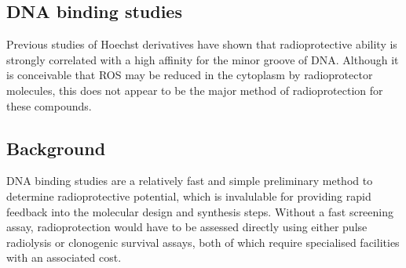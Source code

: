 \begin{refsection}

\section{DNA binding studies}
Previous studies of Hoechst derivatives have shown that radioprotective ability is strongly correlated with a high affinity for the minor groove of DNA.
Although it is conceivable that ROS may be reduced in the cytoplasm by radioprotector molecules, this does not appear to be the major method of radioprotection for these compounds.

\subsection{Background}
DNA binding studies are a relatively fast and simple preliminary method to determine radioprotective potential, which is invalulable for providing rapid feedback into the molecular design and synthesis steps.
Without a fast screening assay, radioprotection would have to be assessed directly using either pulse radiolysis or clonogenic survival assays, both of which require specialised facilities with an associated cost.


\end{refsection}
